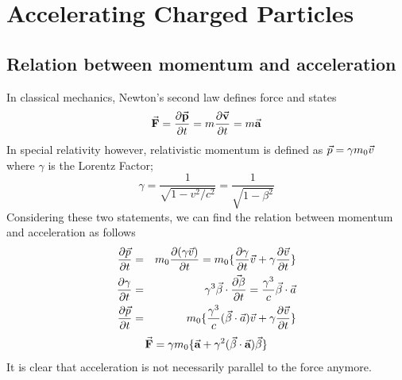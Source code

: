 \documentclass[a4paper,oneside,12pt]{report}
\numberwithin{equation}{chapter}
\begin{document}
\section{Accelerating Charged Particles}

\subsection{Relation between momentum and acceleration}
In classical mechanics, Newton's second law defines force and states 
\begin{equation} \label{eq:newton_second_law}
    \vec{\textbf{F}} = \frac{\partial \vec{\textbf{p}}}{\partial t} = m \frac{\partial \vec{\textbf{v}}}{\partial t} = m \vec{\textbf{a}}
\end{equation}
In special relativity however, relativistic momentum is defined as $\vec{p} = \gamma m_0 \vec{v} $ where $\gamma$ is the Lorentz Factor;
\begin{equation*}
    \gamma = \frac{1}{\sqrt{1-v^2 / c^2}} = \frac{1}{\sqrt{1-\beta^2}}
\end{equation*}
Considering these two statements, we can find the relation between momentum and acceleration as follows
\begin{eqnarray*}
    \frac{\partial \vec{p}}{\partial t} &=& m_0 \frac{\partial (\gamma \vec{v})}{\partial t} = m_0 \{  \frac{\partial \gamma}{\partial t}\vec{v} + \gamma \frac{\partial \vec{v}}{\partial t}  \} \\
    \frac{\partial \gamma}{\partial t} &=& \gamma^3 \vec{\beta} \cdot \vec{\frac{\partial \beta}{\partial t}} = \frac{\gamma^3}{c} \vec{\beta} \cdot \vec{a} \\
    \frac{\partial \vec{p}}{\partial t}  &=& m_0 \{   \frac{\gamma^3}{c} (\vec{\beta} \cdot \vec{a} )\vec{v} + \gamma \frac{\partial \vec{v}}{\partial t}  \} 
\end{eqnarray*}
\begin{equation} \label{eq:Frel}
    \vec{\textbf{F}}  = \gamma m_0 \{ \vec{\textbf{a}} + \gamma^2(\vec{\beta} \cdot \vec{\textbf{a}})\vec{\beta} \}
\end{equation}
It is clear that acceleration is not necessarily parallel to the force anymore. 
\end{document}
